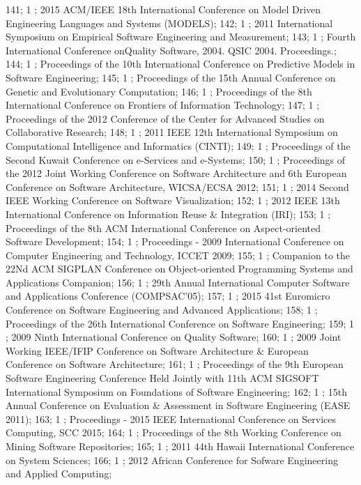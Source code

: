 141; 1 ; 2015 ACM/IEEE 18th International Conference on Model Driven Engineering Languages and Systems (MODELS); 
142; 1 ; 2011 International Symposium on Empirical Software Engineering and Measurement; 
143; 1 ; Fourth International Conference onQuality Software, 2004. QSIC 2004. Proceedings.; 
144; 1 ; Proceedings of the 10th International Conference on Predictive Models in Software Engineering; 
145; 1 ; Proceedings of the 15th Annual Conference on Genetic and Evolutionary Computation; 
146; 1 ; Proceedings of the 8th International Conference on Frontiers of Information Technology; 
147; 1 ; Proceedings of the 2012 Conference of the Center for Advanced Studies on Collaborative Research; 
148; 1 ; 2011 IEEE 12th International Symposium on Computational Intelligence and Informatics (CINTI); 
149; 1 ; Proceedings of the Second Kuwait Conference on e-Services and e-Systems; 
150; 1 ; Proceedings of the 2012 Joint Working Conference on Software Architecture and 6th European Conference on Software Architecture, WICSA/ECSA 2012; 
151; 1 ; 2014 Second IEEE Working Conference on Software Visualization; 
152; 1 ; 2012 IEEE 13th International Conference on Information Reuse {\&} Integration (IRI); 
153; 1 ; Proceedings of the 8th ACM International Conference on Aspect-oriented Software Development; 
154; 1 ; Proceedings - 2009 International Conference on Computer Engineering and Technology, ICCET 2009; 
155; 1 ; Companion to the 22Nd ACM SIGPLAN Conference on Object-oriented Programming Systems and Applications Companion; 
156; 1 ; 29th Annual International Computer Software and Applications Conference (COMPSAC'05); 
157; 1 ; 2015 41st Euromicro Conference on Software Engineering and Advanced Applications; 
158; 1 ; Proceedings of the 26th International Conference on Software Engineering; 
159; 1 ; 2009 Ninth International Conference on Quality Software; 
160; 1 ; 2009 Joint Working IEEE/IFIP Conference on Software Architecture {\&} European Conference on Software Architecture; 
161; 1 ; Proceedings of the 9th European Software Engineering Conference Held Jointly with 11th ACM SIGSOFT International Symposium on Foundations of Software Engineering; 
162; 1 ; 15th Annual Conference on Evaluation {\&} Assessment in Software Engineering (EASE 2011); 
163; 1 ; Proceedings - 2015 IEEE International Conference on Services Computing, SCC 2015; 
164; 1 ; Proceedings of the 8th Working Conference on Mining Software Repositories; 
165; 1 ; 2011 44th Hawaii International Conference on System Sciences; 
166; 1 ; 2012 African Conference for Sofware Engineering and Applied Computing; 
